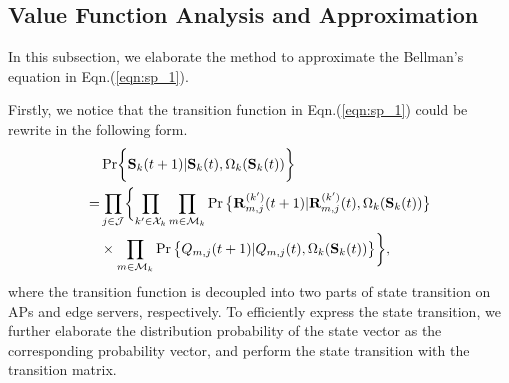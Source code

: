 \subsection{Value Function Analysis and Approximation}

In this subsection, we elaborate the method to approximate the Bellman's equation in Eqn.(\ref{eqn:sp_1}).

Firstly, we notice that the transition function in Eqn.(\ref{eqn:sp_1}) could be rewrite in the following form.
\begin{align}
    & \Pr\Brace{ \Stat_{k}(t+1)|\Stat_{k}(t), \Omega_{k}(\Stat_{k}(t)) }
    \nonumber\\
    =& \prod_{j\in\jSpace} \Brace{
        \prod_{k'\in\ccSet_{k}}\prod_{m\in\esSet_{k}} \Pr\big\{
            \vec{R}^{(k')}_{m,j}(t+1) | \vec{R}^{(k')}_{m,j}(t), \Omega_{k}(\Stat_{k}(t))
        \big\}
        \nonumber\\
        &\times \prod_{m\in\esSet_{k}} \Pr\big\{
            Q_{m,j}(t+1) | Q_{m,j}(t), \Omega_{k}(\Stat_{k}(t))
        \big\}
    },
\end{align}
where the transition function is decoupled into two parts of state transition on APs and edge servers, respectively.
To efficiently express the state transition, we further elaborate the distribution probability of the state vector as the corresponding probability vector, and perform the state transition with the transition matrix.

